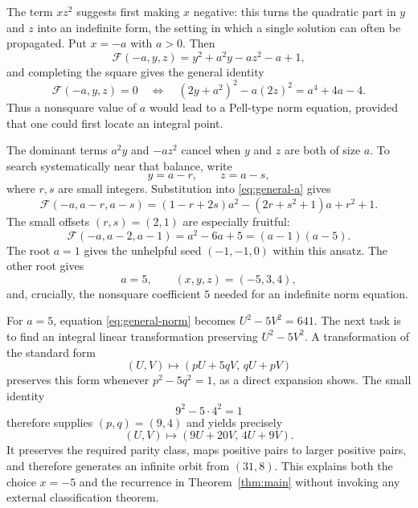 \documentclass[11pt]{article}
\theoremstyle{remark}
\newcommand{\F}{\mathcal F}
\begin{document}
The term $xz^2$ suggests first making $x$ negative: this turns the quadratic part in
$y$ and $z$ into an indefinite form, the setting in which a single solution can often
be propagated.  Put $x=-a$ with $a>0$.  Then
\begin{equation}\label{eq:general-a}
 \F(-a,y,z)=y^2+a^2y-az^2-a+1,
\end{equation}
and completing the square gives the general identity
\begin{equation}\label{eq:general-norm}
 \F(-a,y,z)=0
 \quad\Longleftrightarrow\quad
 (2y+a^2)^2-a(2z)^2=a^4+4a-4.
\end{equation}
Thus a nonsquare value of $a$ would lead to a Pell-type norm equation, provided that
one could first locate an integral point.

The dominant terms $a^2y$ and $-az^2$ cancel when $y$ and $z$ are both of size $a$.
To search systematically near that balance, write
\[
 y=a-r,\qquad z=a-s,
\]
where $r,s$ are small integers.  Substitution into \eqref{eq:general-a} gives
\begin{equation}\label{eq:offset}
 \F(-a,a-r,a-s)
 =(1-r+2s)a^2-(2r+s^2+1)a+r^2+1.
\end{equation}
The small offsets $(r,s)=(2,1)$ are especially fruitful:
\[
 \F(-a,a-2,a-1)=a^2-6a+5=(a-1)(a-5).
\]
The root $a=1$ gives the unhelpful seed $(-1,-1,0)$ within this ansatz.  The other
root gives
\[
 a=5,\qquad (x,y,z)=(-5,3,4),
\]
and, crucially, the nonsquare coefficient $5$ needed for an indefinite norm equation.

For $a=5$, equation \eqref{eq:general-norm} becomes $U^2-5V^2=641$.
The next task is to find an integral linear transformation preserving
$U^2-5V^2$.  A transformation of the standard form
\[
 (U,V)\longmapsto(pU+5qV,\,qU+pV)
\]
preserves this form whenever $p^2-5q^2=1$, as a direct expansion shows.  The
small identity
\[
 9^2-5\cdot4^2=1
\]
therefore supplies $(p,q)=(9,4)$ and yields precisely
\[
 (U,V)\longmapsto(9U+20V,\,4U+9V).
\]
It preserves the required parity class, maps positive pairs to larger positive pairs,
and therefore generates an infinite orbit from $(31,8)$.  This explains both the
choice $x=-5$ and the recurrence in Theorem~\ref{thm:main} without invoking any
external classification theorem.
\end{document}

